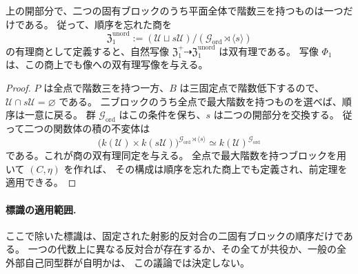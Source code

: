 \begin{proposition}[固有ブロックの内在的な選択]
\label{prop:unordered-blocks-v27}
上の開部分で、二つの固有ブロックのうち平面全体で階数三を持つものは一つだけである。
従って、順序を忘れた商を
\[
 \mathfrak Z_1^{\mathrm{unord}}
 :=(\mathcal U\sqcup s\mathcal U)/
   (\mathcal G_{\mathrm{ord}}\rtimes\langle s\rangle)
\]
の有理商として定義すると、自然写像
$\mathfrak Z_1^+\dashrightarrow\mathfrak Z_1^{\mathrm{unord}}$ は双有理である。
写像 $\Phi_1$ は、この商上でも像への双有理写像を与える。
\end{proposition}

\begin{proof}
$P$ は全点で階数三を持つ一方、$B$ は三固定点で階数低下するので、
$\mathcal U\cap s\mathcal U=\varnothing$ である。
二ブロックのうち全点で最大階数を持つものを選べば、順序は一意に戻る。
群 $\mathcal G_{\mathrm{ord}}$ はこの条件を保ち、$s$ は二つの開部分を交換する。
従って二つの関数体の積の不変体は
\[
 \bigl(k(\mathcal U)\times k(s\mathcal U)\bigr)^{{\mathcal G}_{\mathrm{ord}}\rtimes\langle s\rangle}
 \simeq k(\mathcal U)^{{\mathcal G}_{\mathrm{ord}}}
\]
である。これが商の双有理同定を与える。
全点で最大階数を持つブロックを用いて $(C,\eta)$ を作れば、
その構成は順序を忘れた商上でも定義され、前定理を適用できる。
\end{proof}

\paragraph{標識の適用範囲.}
ここで除いた標識は、固定された射影的反対合の二固有ブロックの順序だけである。
一つの代数上に異なる反対合が存在するか、その全てが共役か、一般の全外部自己同型群が自明かは、
この議論では決定しない。
